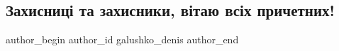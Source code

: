  
 
 
 
 

\subsection{Захисниці та захисники, вітаю всіх причетних!}
\label{sec:14_10_2022.fb.galushko_denis.1.zakhisnits__ta_zakhi}

\ifcmt
 author_begin
   author_id galushko_denis
 author_end
\fi
